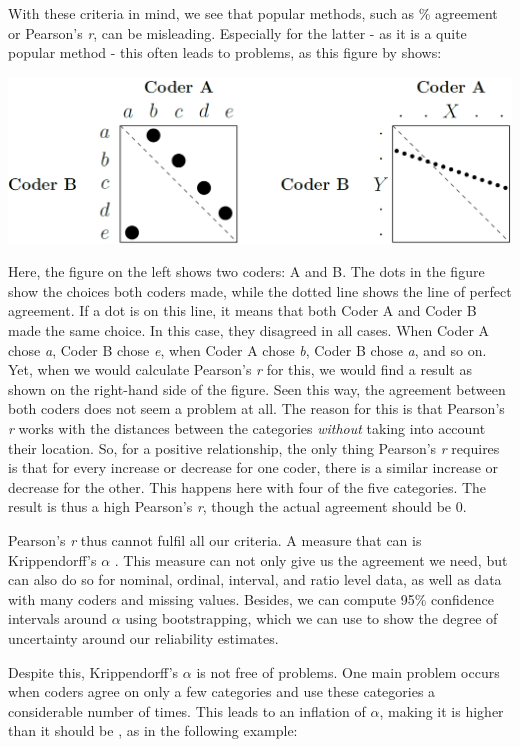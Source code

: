 \documentclass[
]{article}
\begin{document}
With these criteria in mind, we see that popular methods, such as \% agreement or Pearson's \emph{r}, can be misleading. Especially for the latter - as it is a quite popular method - this often leads to problems, as this figure by \textcite{Krippendorff2004a} shows:

\begin{center}\includegraphics[width=0.75\linewidth]{figures/observers} \end{center}

Here, the figure on the left shows two coders: A and B. The dots in the figure show the choices both coders made, while the dotted line shows the line of perfect agreement. If a dot is on this line, it means that both Coder A and Coder B made the same choice. In this case, they disagreed in all cases. When Coder A chose \emph{a}, Coder B chose \emph{e}, when Coder A chose \emph{b}, Coder B chose \emph{a}, and so on. Yet, when we would calculate Pearson's \emph{r} for this, we would find a result as shown on the right-hand side of the figure. Seen this way, the agreement between both coders does not seem a problem at all. The reason for this is that Pearson's \emph{r} works with the distances between the categories \emph{without} taking into account their location. So, for a positive relationship, the only thing Pearson's \emph{r} requires is that for every increase or decrease for one coder, there is a similar increase or decrease for the other. This happens here with four of the five categories. The result is thus a high Pearson's \emph{r}, though the actual agreement should be 0.

Pearson's \emph{r} thus cannot fulfil all our criteria. A measure that can is Krippendorff's \(\alpha\) \autocite{Krippendorff2004a}. This measure can not only give us the agreement we need, but can also do so for nominal, ordinal, interval, and ratio level data, as well as data with many coders and missing values. Besides, we can compute 95\% confidence intervals around \(\alpha\) using bootstrapping, which we can use to show the degree of uncertainty around our reliability estimates.

Despite this, Krippendorff's \(\alpha\) is not free of problems. One main problem occurs when coders agree on only a few categories and use these categories a considerable number of times. This leads to an inflation of \(\alpha\), making it is higher than it should be \autocite{Krippendorff2004a}, as in the following example:
\end{document}
